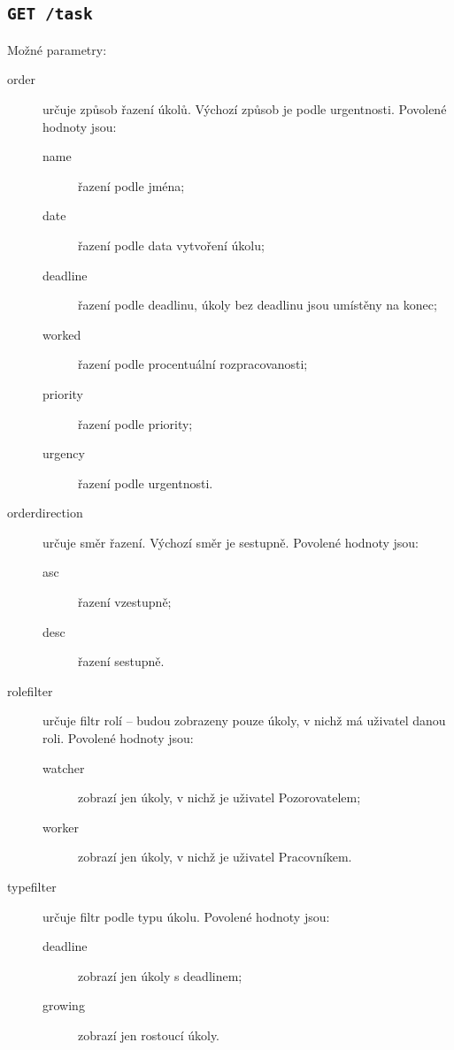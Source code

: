 \documentclass[thesis=B,czech]{FITthesis}[2012/06/26]
\begin{document}
		\subsection{\texttt{GET /task}}
			Možné parametry:
			\begin{description}
				\item[order] určuje způsob řazení úkolů. Výchozí způsob je podle urgentnosti. Povolené hodnoty jsou: 
				\begin{description}
					\item[name] řazení podle jména;
					\item[date] řazení podle data vytvoření úkolu;
					\item[deadline] řazení podle deadlinu, úkoly bez deadlinu jsou umístěny na konec;
					\item[worked] řazení podle procentuální rozpracovanosti;
					\item[priority] řazení podle priority;
					\item[urgency] řazení podle urgentnosti.
				\end{description}
				
				\item[orderdirection] určuje směr řazení. Výchozí směr je sestupně. Povolené hodnoty jsou:
				\begin{description}
					\item[asc] řazení vzestupně;
					\item[desc] řazení sestupně.
				\end{description}
				
				\item[rolefilter] určuje filtr rolí -- budou zobrazeny pouze úkoly, v nichž má uživatel danou roli. Povolené hodnoty jsou:
				\begin{description}
					\item[watcher] zobrazí jen úkoly, v nichž je uživatel Pozorovatelem;
					\item[worker] zobrazí jen úkoly, v nichž je uživatel Pracovníkem.
				\end{description}
				
				\item[typefilter] určuje filtr podle typu úkolu. Povolené hodnoty jsou:
				\begin{description}
					\item[deadline] zobrazí jen úkoly s deadlinem;
					\item[growing] zobrazí jen rostoucí úkoly.
				\end{description}
				

\end{description}
\end{document}
